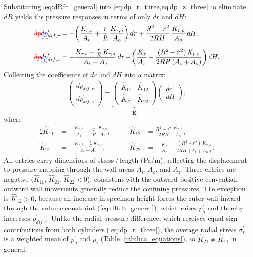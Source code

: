 \documentclass[a4paper,fleqn]{cas-sc}
\makeatletter
\providecommand{\DIFadd}[1]{{\protect\color{blue}\uwave{#1}}} %
\providecommand{\DIFdel}[1]{{\protect\color{red}\sout{#1}}} %
\providecommand{\DIFaddbegin}{} %
\providecommand{\DIFaddend}{} %
\providecommand{\DIFdelbegin}{} %
\providecommand{\DIFdelend}{} %
\let\sout@orig\sout %
\renewcommand{\sout}[1]{\ifmmode\text{\sout@orig{\ensuremath{#1}}}\else\sout@orig{#1}\fi} %
\makeatother
\begin{document}
Substituting \cref{eq:dRdt_general} into \cref{eq:dp_r_three,eq:dp_z_three} to eliminate $dR$ yields the pressure responses in terms of only $dr$ and $dH$:
\begin{align}
\DIFdelbegin \DIFdel{\delta p}\DIFdelend \DIFaddbegin \DIFadd{dp}\DIFaddend _{dif,r}^{\prime}
  &= -\!\left(\frac{K_{r,i}}{A_i}+\frac{r}{R}\,\frac{K_{r,o}}{A_o}\right)dr
     +\frac{R^2-r^2}{2RH}\,\frac{K_{r,o}}{A_o}\,dH, \label{eq:dp_r_two}\\[6pt]
\DIFdelbegin \DIFdel{\delta p}\DIFdelend \DIFaddbegin \DIFadd{dp}\DIFaddend _{dif,z}^{\prime}
  &= -\frac{K_{r,i}-\frac{r}{R}\,K_{r,o}}{A_i+A_o}\,dr
     -\!\left(\frac{K_z}{A_z}+\frac{(R^2-r^2)\,K_{r,o}}{2RH\,(A_i+A_o)}\right)dH. \label{eq:dp_z_two}
\end{align}
Collecting the coefficients of $dr$ and $dH$ into a matrix:
\begin{equation}
\DIFdelbegin %
\DIFdelend \DIFaddbegin \begin{pmatrix} dp_{dif,r}^{\prime} \\[4pt] dp_{dif,z}^{\prime} \end{pmatrix}\DIFaddend 
=
\underbrace{\begin{pmatrix} \hat{K}_{11} & \hat{K}_{12} \\[8pt] \hat{K}_{21} & \hat{K}_{22} \end{pmatrix}}_{\hat{\mathbf{K}}}
\begin{pmatrix} dr \\[4pt] dH \end{pmatrix},
\label{eq:stiffness_matrix}
\end{equation}
where
\begin{alignat}{2}
\hat{K}_{11} &= -\frac{K_{r,i}}{A_i}-\frac{r}{R}\,\frac{K_{r,o}}{A_o}, &\qquad
\hat{K}_{12} &= \frac{R^2-r^2}{2RH}\,\frac{K_{r,o}}{A_o}, \label{eq:Khat_row1}\\[4pt]
\hat{K}_{21} &= -\frac{K_{r,i}-\frac{r}{R}\,K_{r,o}}{A_i+A_o}, &\qquad
\hat{K}_{22} &= -\frac{K_z}{A_z}-\frac{(R^2-r^2)\,K_{r,o}}{2RH\,(A_i+A_o)}. \label{eq:Khat_row2}
\end{alignat}
All entries carry dimensions of stress\,/\,length (Pa/m), reflecting the displacement-to-pressure mapping through the wall areas $A_i$, $A_o$, and $A_z$. Three entries are negative ($\hat{K}_{11}$, $\hat{K}_{21}$, $\hat{K}_{22}<0$), consistent with the outward-positive convention: outward wall movements generally reduce the confining pressures. The exception is $\hat{K}_{12}>0$, because an increase in specimen height forces the outer wall inward through the volume constraint (\cref{eq:dRdt_general}), which raises $p_o^{\prime}$ and thereby increases $p_{dif,r}^{\prime}$. Unlike the radial pressure difference, which receives equal-sign contributions from both cylinders (\cref{eq:dp_r_three}), the average radial stress $\sigma_r^{\prime}$ is a weighted mean of $p_o^{\prime}$ and $p_i^{\prime}$ (Table~\ref{tab:hca_equations}), so $\hat{K}_{21}\neq\hat{K}_{11}$ in general.
\end{document}
